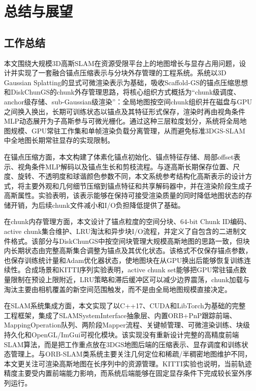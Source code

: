 \chapter{总结与展望}

\section{工作总结}

本文围绕大规模3D高斯SLAM在资源受限平台上的地图增长与显存占用问题，设计并实现了一套融合锚点压缩表示与分块外存管理的工程系统\ScaffoldChunGS。系统以3D Gaussian Splatting的显式可微渲染表示为基础\cite{kerbl20233dgaussians}，吸收Scaffold-GS的锚点压缩思想\cite{lu2024scaffoldgs}和DiskChunGS的chunk外存管理思路\cite{feldmann2026diskchungs}，将核心组织方式概括为“chunk级调度、anchor级存储、sub-Gaussian级渲染”：全局地图按空间chunk组织并在磁盘与GPU之间换入换出，长期可训练状态以锚点及其特征形式保存，渲染时再由视角条件MLP动态展开为子高斯参与可微光栅化。通过这种三层粒度划分，系统将全局地图规模、GPU常驻工作集和单帧渲染负载分离管理，从而避免标准3DGS-SLAM中全地图长期常驻显存的实现限制。

在锚点压缩方面，本文构建了体素化锚点初始化、锚点特征存储、局部offset表示、视角条件MLP解码以及锚点生长和剪枝流程。与逐高斯长期保存位置、尺度、旋转、不透明度和球谐颜色参数不同，本文系统参考结构化高斯表示的设计方式\cite{lu2024scaffoldgs}，将主要外观和几何细节压缩到锚点特征和共享解码器中，并在渲染阶段生成子高斯属性。实验表明，该表示能够在保持可接受渲染质量的同时降低地图状态的存储开销，为后续chunk文件减小和I/O负担降低提供了基础。

在chunk内存管理方面，本文设计了锚点粒度的空间分块、64-bit Chunk ID编码、active chunk集合维护、LRU淘汰和异步块I/O流程，并定义了自包含的\schun 二进制文件格式。该部分与DiskChunGS中按空间块管理大规模高斯地图的思路一致\cite{feldmann2026diskchungs}，但块内长期状态由完整高斯集合调整为锚点及其优化状态。该格式不仅保存锚点参数，也保存训练统计量和Adam优化器状态\cite{kingma2014adam}，使地图块在从GPU换出后能够恢复训练连续性。合成场景和KITTI序列实验表明，active chunk set能够把GPU常驻锚点数量限制在预设上限附近，LRU策略和滞后缓冲区可以减少边界震荡，chunk加载与淘汰主要由相机覆盖的新空间范围触发，而不是由全局地图规模直接决定。

在SLAM系统集成方面，本文实现了以C++17、CUDA和LibTorch为基础的完整工程框架，集成了SLAMSystemInterface抽象层、内置ORB+PnP跟踪前端、MappingOperation队列、两阶段Mapper流程、关键帧管理、可微渲染训练、块级持久化和OpenGL/ImGui可视化模块。该实现没有重新设计完整的高精度前端SLAM算法，而是把工作重点放在3DGS地图后端的压缩表示、显存调度和训练状态管理上。与ORB-SLAM类系统主要关注几何定位和稀疏/半稠密地图维护不同\cite{mur2017orb}，本文更关注可渲染高斯地图在长序列中的资源管理。KITTI实验也说明\cite{Geiger2012CVPR}，当前轨迹精度主要受内置前端能力影响，而系统后端能够在固定显存条件下完成较长室外序列运行。


